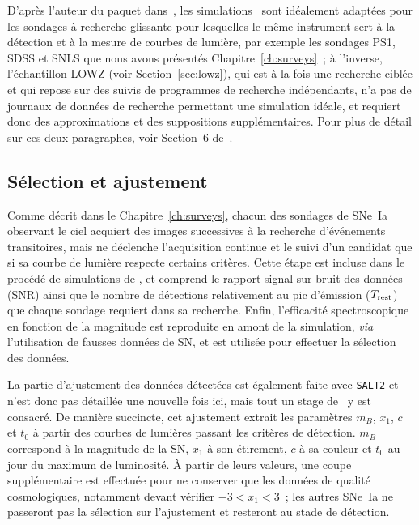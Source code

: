 \documentclass[../main/main.tex]{subfiles}
\begin{document}
D'après l'auteur du paquet dans~\cite{kessler2019}, les simulations \snana\ sont
idéalement adaptées pour les sondages à recherche glissante pour lesquelles le
même instrument sert à la détection et à la mesure de courbes de lumière, par
exemple les sondages PS1, SDSS et SNLS que nous avons présentés
Chapitre~\ref{ch:surveys}~; à l'inverse, l'échantillon LOWZ (voir
Section~\ref{sec:lowz}), qui est à la fois une recherche ciblée et qui repose
sur des suivis de programmes de recherche indépendants, n'a pas de journaux de
données de recherche permettant une simulation idéale, et requiert donc des
approximations et des suppositions supplémentaires. Pour plus de détail sur ces
deux paragraphes, voir Section~6 de~\cite{kessler2019}.

\subsection{Sélection et ajustement}\label{ssec:simdetec}

Comme décrit dans le Chapitre~\ref{ch:surveys}, chacun des sondages de SNe~Ia
observant le ciel acquiert des images successives à la recherche d'événements
transitoires, mais ne déclenche l'acquisition continue et le suivi d'un candidat
que si sa courbe de lumière respecte certains critères. Cette étape est incluse
dans le procédé de simulations de \snana, et comprend le rapport signal sur
bruit des données (SNR) ainsi que le nombre de détections relativement au pic
d'émission ($T_{\rm rest}$) que chaque sondage requiert dans sa recherche.
Enfin, l'efficacité spectroscopique en fonction de la magnitude est reproduite
en amont de la simulation, \textit{via} l'utilisation de fausses données de SN,
et est utilisée pour effectuer la sélection des données.

La partie d'ajustement des données détectées est également faite avec
\texttt{SALT2} et n'est donc pas détaillée une nouvelle fois ici, mais tout un
stage de \snana\ y est consacré. De manière succincte, cet ajustement extrait
les paramètres $m_B$, $x_1$, $c$ et $t_0$ à partir des courbes de lumières
passant les critères de détection. $m_B$ correspond à la magnitude de la SN,
$x_1$ à son étirement, $c$ à sa couleur et $t_0$ au jour du maximum de
luminosité. À partir de leurs valeurs, une coupe supplémentaire est effectuée
pour ne conserver que les données de qualité cosmologiques, notamment devant
vérifier $-3 < x_1 < 3$~; les autres SNe~Ia ne passeront pas la sélection sur
l'ajustement et resteront au stade de détection.
\end{document}
